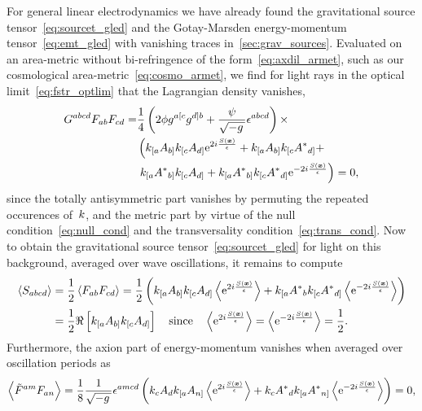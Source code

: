 For general linear electrodynamics we have already found the gravitational source tensor~\eqref{eq:sourcet_gled} and the Gotay-Marsden energy-momentum tensor~\eqref{eq:emt_gled} with vanishing traces in~\autoref{sec:grav_sources}. Evaluated on an area-metric without bi-refringence of the form~\eqref{eq:axdil_armet}, such as our cosmological area-metric~\eqref{eq:cosmo_armet}, we find for light rays in the optical limit~\eqref{eq:fstr_optlim} that the Lagrangian density vanishes,
\begin{align}
	G^{abcd}F_{ab}F_{cd}=&\frac{1}{4}\left(2\phi g^{a[ c}g^{d] b}+\frac{\psi}{\sqrt{-g\,}}\epsilon^{abcd}\right)\times\nonumber\\
	&\left(k_{[ a}A_{b]}k_{[ c}A_{d]}\mathrm{e}^{2i\frac{S(\boldsymbol{x})}{\epsilon}}+
	k_{[ a}A_{b]}k_{[ c}{{A}^{*}}_{d]}+\right.\nonumber\\
	&\left.k_{[ a}{{A}^{*}}_{b]}k_{[ c}A_{d]}+
	k_{[ a}{{A}^{*}}_{b]}k_{[ c}{{A}^{*}}_{d]}\mathrm{e}^{-2i\frac{S(\boldsymbol{x})}{\epsilon}}\right)
	=0
	\mathpunct{,}
\end{align}
since the totally antisymmetric part vanishes by permuting the repeated occurences of~$k$, and the metric part by virtue of the null condition~\eqref{eq:null_cond} and the transversality condition~\eqref{eq:trans_cond}. Now to obtain the gravitational source tensor~\eqref{eq:sourcet_gled} for light on this background, averaged over wave oscillations, it remains to compute
\begin{align}
	\left<{S_{abcd}}\right>&=\frac{1}{2}\left<{F_{ab}F_{cd}}\right>=\frac{1}{2}\left(k_{[ a}A_{b]}k_{[ c}A_{d]}\left<{\mathrm{e}^{2i\frac{S(\boldsymbol{x})}{\epsilon}}}\right>+k_{[ a}{{A}^{*}}_{b}k_{[ c}{{A}^{*}}_{d]}\left<{\mathrm{e}^{-2i\frac{S(\boldsymbol{x})}{\epsilon}}}\right>\right)\\
	&=\frac{1}{2}\Re\left[k_{[ a}A_{b]}k_{[ c}A_{d]}\right] \quad \text{since} \quad \left<{\mathrm{e}^{2i\frac{S(\boldsymbol{x})}{\epsilon}}}\right>=\left<{\mathrm{e}^{-2i\frac{S(\boldsymbol{x})}{\epsilon}}}\right>=\frac{1}{2}
	\mathpunct{.}
\end{align}
Furthermore, the axion part of energy-momentum vanishes when averaged over oscillation periods as
\begin{equation}
	\left<{\tilde{F}^{am}F_{an}}\right>=\frac{1}{8}\frac{1}{\sqrt{-g\,}}\epsilon^{amcd}
	\left(k_{c}A_{d}k_{[ a}A_{n]}\left<{\mathrm{e}^{2i\frac{S(\boldsymbol{x})}{\epsilon}}}\right>+k_{c}{{A}^{*}}_{d}k_{[ a}{{A}^{*}}_{n]}\left<{\mathrm{e}^{-2i\frac{S(\boldsymbol{x})}{\epsilon}}}\right>\right)=0
	\mathpunct{,}
\end{equation}
